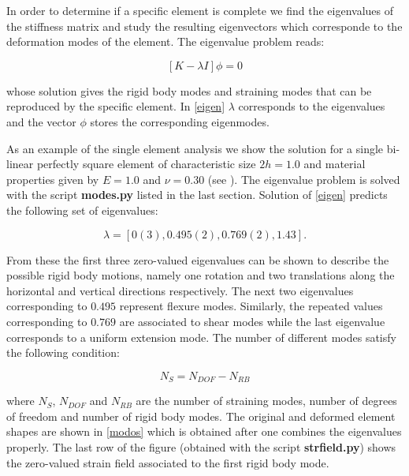 In order to determine if a specific element is complete we find the eigenvalues of the stiffness matrix and study the resulting eigenvectors which corresponde to the deformation modes of the element. The eigenvalue problem reads:

\begin{equation}
\left[ {K - \lambda I} \right]\phi  = 0
\label{eigen}
\end{equation}

whose solution gives the rigid body modes and straining modes that can be reproduced by the specific element. In \cref{eigen} $\lambda$ corresponds to the eigenvalues and the vector $\phi$ stores the corresponding eigenmodes.

As an example of the single element analysis we show the solution for a single bi-linear perfectly square element of characteristic size $2h=1.0$ and material properties given by $E=1.0$ and $\nu = 0.30$ (see \citep{Bathe1995}). The eigenvalue problem is solved with the script {\bf modes.py} listed in the last section. Solution of \cref{eigen} predicts the following set of eigenvalues:


\[\lambda  = [0(3),0.495(2),0.769(2),1.43].\]

From these the first three zero-valued eigenvalues can be shown to describe the possible rigid body motions, namely one rotation and two translations along the horizontal and vertical directions respectively. The next two eigenvalues corresponding to $0.495$ represent flexure modes. Similarly, the repeated values corresponding to $0.769$ are associated to shear modes while the last eigenvalue corresponds to a uniform extension mode. The number of different modes satisfy the following condition:

\[{N_S} = {N_{DOF}} - {N_{RB}}\]

where ${N_S}$, ${N_{DOF}}$ and ${N_{RB}}$ are the number of straining modes, number of degrees of freedom and number of rigid body modes. The original and deformed element shapes are shown in \cref{modos} which is obtained after one combines the eigenvalues properly. The last row of the figure (obtained with the script {\bf strfield.py}) shows the zero-valued strain field associated to the first rigid body mode.

